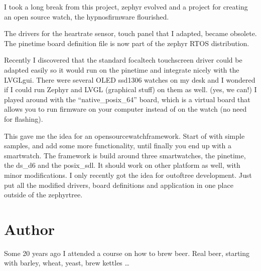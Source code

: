 \documentclass[letterpaper,10pt,english]{sphinxmanual}
\begin{document}
I took a long break from this project, zephyr evolved and a project for creating an open source watch, the hypnos\sphinxhyphen{}firmware flourished.

The drivers for the heartrate sensor, touch panel that I adapted, became obsolete.
The pinetime board definition file is now part of the zephyr RTOS distribution.

Recently I discovered that the standard focaltech touchscreen driver could be adapted easily so it would run on the pinetime and integrate nicely with the LVGL\sphinxhyphen{}gui. There were several OLED ssd1306 watches on my desk and I wondered if I could run Zephyr and LVGL (graphical stuff) on them as well. (yes, we can!)
I played around with the “native\_posix\_64” board, which is a virtual board that allows you to run firmware on your computer instead of on the watch (no need for flashing).

This gave me the idea for an opensource\sphinxhyphen{}watch\sphinxhyphen{}framework.
Start of with simple samples, and add some more functionality, until finally you end up with a smartwatch.
The framework is build around three smartwatches, the pinetime, the ds\_d6 and the posix\_sdl.
It should work on other platform as well, with minor modifications.
I only recently got the idea for out\sphinxhyphen{}of\sphinxhyphen{}tree development.
Just put all the modified drivers, board definitions and application in one place outside of the zephyr\sphinxhyphen{}tree.

\begin{sphinxVerbatim}[commandchars=\\\{\}]
        
           
\end{sphinxVerbatim}


\chapter{Author}
\label{\detokenize{author:author}}\label{\detokenize{author::doc}}
Some 20 years ago I attended a course on how to brew beer.
Real beer, starting with barley, wheat, yeast, brew kettles …
\end{document}
